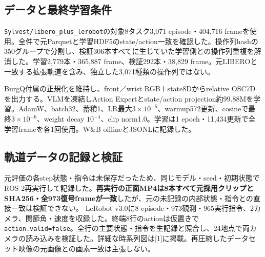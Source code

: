 \documentclass[paper=a4,fontsize=10pt,baselineskip=15pt]{jlreq}
\begin{document}
\subsection{データと最終学習条件}
\texttt{Sylvest/libero\_plus\_lerobot}の対象8タスク3,071 episode・404,716 frameを使用。全件で元Parquetと学習HDF5のstate/action一致を確認した。操作列hashの350グループで分割し、検証306本すべてに生じていた学習側との操作列重複を解消した。学習2,779本・365,887 frame、検証292本・38,829 frame。元LIBEROと一致する拡張軌道を含み、独立した3,071種類の操作列ではない。

BurgQ付属の正規化を維持し、front／wrist RGB＋state8Dからrelative OSC7Dを出力する。VLMを凍結しAction Expertとstate/action projection約99.88Mを学習。AdamW、batch32、蓄積1、LR最大$3\times10^{-5}$、warmup572更新、cosineで最終$3\times10^{-6}$、weight decay $10^{-4}$、clip norm1.0。学習は1 epoch・11,434更新で全学習frameを各1回使用。W\&B offlineとJSONLに記録した。
\subsection{軌道データの記録と検証}
元評価の各step状態・指令は未保存だったため、同じモデル・seed・初期状態でROS 2再実行して記録した。\textbf{再実行の正面MP4は8本すべて元採用クリップとSHA256・全973復号frameが一致}したが、元の未記録の内部状態・指令との直接一致は検証できない。
LeRobot v3.0に8 episode・973観測・965実行指令、2カメラ、関節角・速度を収録した。終端8行のactionは仮置きで\texttt{action.valid=false}。全行の主要状態・指令を生記録と照合し、24地点で両カメラの読み込みを検証した。詳細な時系列図は[1]に掲載。再圧縮したデータセット映像の元画像との画素一致は主張しない。
\newpage
\end{document}
